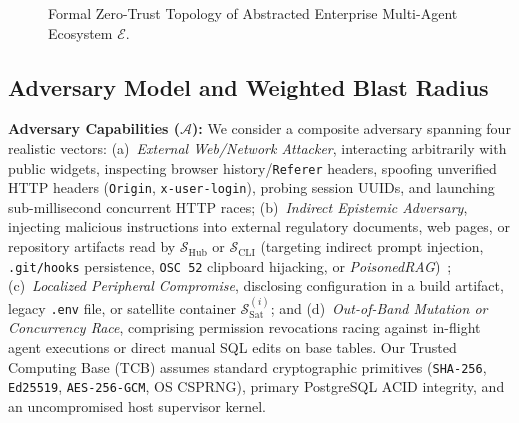 \documentclass[10pt,twocolumn]{article}
\begin{document}
\begin{figure}[t]
\caption{Formal Zero-Trust Topology of Abstracted Enterprise Multi-Agent Ecosystem $\mathcal{E}$.}
\label{fig:topology}
\end{figure}

\subsection{Adversary Model and Weighted Blast Radius}

\textbf{Adversary Capabilities ($\mathcal{A}$):} We consider a composite adversary spanning four realistic vectors: (a)~\emph{External Web/Network Attacker}, interacting arbitrarily with public widgets, inspecting browser history/\texttt{Referer} headers, spoofing unverified HTTP headers (\texttt{Origin}, \texttt{x-user-login}), probing session UUIDs, and launching sub-millisecond concurrent HTTP races; (b)~\emph{Indirect Epistemic Adversary}, injecting malicious instructions into external regulatory documents, web pages, or repository artifacts read by $\mathcal{S}_{\mathrm{Hub}}$ or $\mathcal{S}_{\mathrm{CLI}}$ (targeting indirect prompt injection, \texttt{.git/hooks} persistence, \texttt{OSC 52} clipboard hijacking, or \emph{PoisonedRAG})~\cite{R22,R26}; (c)~\emph{Localized Peripheral Compromise}, disclosing configuration in a build artifact, legacy \texttt{.env} file, or satellite container $\mathcal{S}_{\mathrm{Sat}}^{(i)}$; and (d)~\emph{Out-of-Band Mutation or Concurrency Race}, comprising permission revocations racing against in-flight agent executions or direct manual SQL edits on base tables. Our Trusted Computing Base (TCB) assumes standard cryptographic primitives (\texttt{SHA-256}, \texttt{Ed25519}, \texttt{AES-256-GCM}, OS CSPRNG), primary PostgreSQL ACID integrity, and an uncompromised host supervisor kernel.
\end{document}
